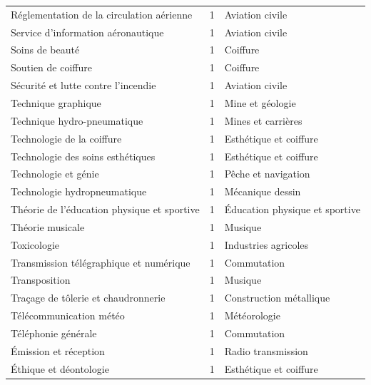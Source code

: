 \documentclass[11pt,a4paper]{article}
\begin{document}
\begin{longtable}{@{}>{\raggedright\arraybackslash}p{5cm}c>{\raggedright\arraybackslash}p{8.4cm}@{}}
Réglementation de la circulation aérienne & 1 & Aviation civile\\
Service d'information aéronautique & 1 & Aviation civile\\
Soins de beauté & 1 & Coiffure\\
Soutien de coiffure & 1 & Coiffure\\
Sécurité et lutte contre l'incendie & 1 & Aviation civile\\
Technique graphique & 1 & Mine et géologie\\
Technique hydro-pneumatique & 1 & Mines et carrières\\
Technologie de la coiffure & 1 & Esthétique et coiffure\\
Technologie des soins esthétiques & 1 & Esthétique et coiffure\\
Technologie et génie & 1 & Pêche et navigation\\
Technologie hydropneumatique & 1 & Mécanique dessin\\
Théorie de l'éducation physique et sportive & 1 & Éducation physique et sportive\\
Théorie musicale & 1 & Musique\\
Toxicologie & 1 & Industries agricoles\\
Transmission télégraphique et numérique & 1 & Commutation\\
Transposition & 1 & Musique\\
Traçage de tôlerie et chaudronnerie & 1 & Construction métallique\\
Télécommunication météo & 1 & Météorologie\\
Téléphonie générale & 1 & Commutation\\
Émission et réception & 1 & Radio transmission\\
Éthique et déontologie & 1 & Esthétique et coiffure\\
\bottomrule
\end{longtable}
\end{document}
